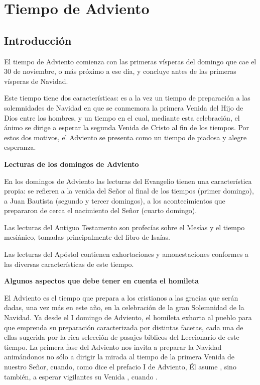 \section{Tiempo de Adviento}

\subsection{Introducción}

El tiempo de Adviento comienza con las primeras vísperas del domingo que cae el 30 de noviembre, o más próximo a ese día, y concluye antes de las primeras vísperas de Navidad.

Este tiempo tiene dos características: es a la vez un tiempo de preparación a las solemnidades de Navidad en que se conmemora la primera Venida del Hijo de Dios entre los hombres, y un tiempo en el cual, mediante esta celebración, el ánimo se dirige a esperar la segunda Venida de Cristo al fin de los tiempos. Por estos dos motivos, el Adviento se presenta como un tiempo de piadosa y alegre esperanza.

\textbf{Lecturas de los domingos de Adviento}

En los domingos de Adviento las lecturas del Evangelio tienen una característica propia: se refieren a la venida del Señor al final de los tiempos (primer domingo), a Juan Bautista (segundo y tercer domingos), a
los acontecimientos que prepararon de cerca el nacimiento del Señor (cuarto domingo).

Las lecturas del Antiguo Testamento son profecías sobre el Mesías y el tiempo mesiánico, tomadas principalmente del libro de Isaías.

Las lecturas del Apóstol contienen exhortaciones y amonestaciones conformes a las diversas características de este tiempo.

\textbf{Algunos aspectos que debe tener en cuenta el homileta}

El Adviento es el tiempo que prepara a los cristianos a las gracias que serán dadas, una vez más en este año, en la celebración de la gran Solemnidad de la Navidad. Ya desde el I domingo de Adviento, el homileta exhorta al pueblo para que emprenda su preparación caracterizada por distintas facetas, cada una de ellas sugerida por la rica selección de pasajes bíblicos del Leccionario de este tiempo. La primera fase del Adviento nos invita a preparar la Navidad animándonos no sólo a dirigir la mirada al tiempo de la primera Venida de nuestro Señor, cuando, como dice el prefacio I de Adviento, Él asume , sino también, a esperar vigilantes su Venida , cuando .


